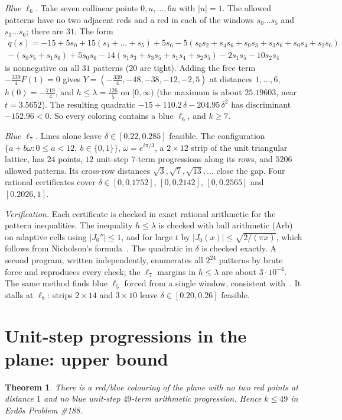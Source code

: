 \documentclass[11pt]{amsart}
\newtheorem{theorem}{Theorem}[section]
\theoremstyle{definition}
\begin{document}
\emph{Blue $\ell_6$.} Take seven collinear points $0,u,\dots,6u$ with $|u|=1$. The allowed patterns have no two adjacent reds and a red in each of the windows $s_0\dots s_5$ and $s_1\dots s_6$; there are $31$. The form
\begin{multline*}
q(s)=-15+5s_0+15(s_1+\dots+s_5)+5s_6-5(s_0s_2+s_4s_6+s_0s_3+s_3s_6+s_0s_4+s_2s_6)\\
-(s_0s_5+s_1s_6)+5s_0s_6-14(s_1s_3+s_3s_5+s_1s_4+s_2s_5)-2s_1s_5-10s_2s_4
\end{multline*}
is nonnegative on all $31$ patterns ($20$ are tight). Adding the free term $-\tfrac{339}{4}F(1)=0$ gives $Y=(-\tfrac{339}4,-48,-38,-12,-2,5)$ at distances $1,\dots,6$, $h(0)=-\tfrac{719}4$, and $h\le\lambda=\tfrac{126}5$ on $[0,\infty)$ (the maximum is about $25.19603$, near $t=3.5652$). The resulting quadratic $-15+110.2\,\delta-204.95\,\delta^2$ has discriminant $-152.96<0$. So every coloring contains a blue $\ell_6$, and $k\ge7$.

\emph{Blue $\ell_7$.} Lines alone leave $\delta\in[0.22,0.285]$ feasible. The configuration $\{a+b\omega:0\le a<12,\ b\in\{0,1\}\}$, $\omega=e^{i\pi/3}$, a $2\times12$ strip of the unit triangular lattice, has $24$ points, $12$ unit-step $7$-term progressions along its rows, and $5206$ allowed patterns. Its cross-row distances $\sqrt3,\sqrt7,\sqrt{13},\dots$ close the gap. Four rational certificates cover $\delta\in[0,0.1752]$, $[0,0.2142]$, $[0,0.2565]$ and $[0.2026,1]$.

\emph{Verification.} Each certificate is checked in exact rational arithmetic for the pattern inequalities. The inequality $h\le\lambda$ is checked with ball arithmetic (Arb) on adaptive cells using $|J_0''|\le1$, and for large $t$ by $|J_0(x)|\le\sqrt{2/(\pi x)}$, which follows from Nicholson's formula~\cite[\S13.74]{Watson}. The quadratic in $\delta$ is checked exactly. A second program, written independently, enumerates all $2^{24}$ patterns by brute force and reproduces every check; the $\ell_7$ margins in $h\le\lambda$ are about $3\cdot10^{-4}$. The same method finds blue $\ell_5$ forced from a single window, consistent with~\cite{Tsaturian}. It stalls at $\ell_8$: strips $2\times14$ and $3\times10$ leave $\delta\in[0.20,0.26]$ feasible.

\section{Unit-step progressions in the plane: upper bound}\label{sec:188up}

\begin{theorem}\label{thm:188up}
There is a red/blue colouring of the plane with no two red points at distance $1$ and no blue unit-step $49$-term arithmetic progression. Hence $k\le49$ in Erd\H{o}s Problem \#188.
\end{theorem}
\end{document}

